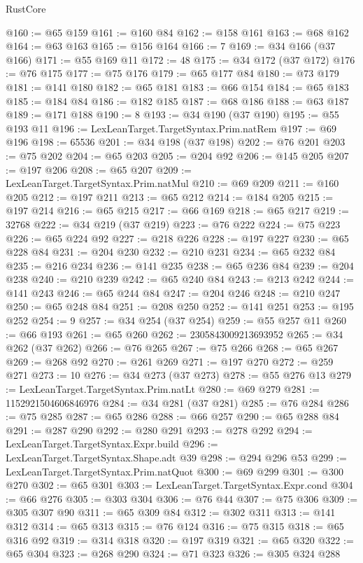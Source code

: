 \begin{lexlean}{RustCore}
\begin{coremodule}
@160 := @65 @159
@161 := @160 @84
@162 := @158 @161
@163 := @68 @162
@164 := @63 @163
@165 := @156 @164
@166 := 7
@169 := @34 @166 (@37 @166)
@171 := @55 @169 @11
@172 := 48
@175 := @34 @172 (@37 @172)
@176 := @76 @175
@177 := @75 @176
@179 := @65 @177 @84
@180 := @73 @179
@181 := @141 @180
@182 := @65 @181
@183 := @66 @154
@184 := @65 @183
@185 := @184 @84
@186 := @182 @185
@187 := @68 @186
@188 := @63 @187
@189 := @171 @188
@190 := 8
@193 := @34 @190 (@37 @190)
@195 := @55 @193 @11
@196 := LexLeanTarget.TargetSyntax.Prim.natRem
@197 := @69 @196
@198 := 65536
@201 := @34 @198 (@37 @198)
@202 := @76 @201
@203 := @75 @202
@204 := @65 @203
@205 := @204 @92
@206 := @145 @205
@207 := @197 @206
@208 := @65 @207
@209 := LexLeanTarget.TargetSyntax.Prim.natMul
@210 := @69 @209
@211 := @160 @205
@212 := @197 @211
@213 := @65 @212
@214 := @184 @205
@215 := @197 @214
@216 := @65 @215
@217 := @66 @169
@218 := @65 @217
@219 := 32768
@222 := @34 @219 (@37 @219)
@223 := @76 @222
@224 := @75 @223
@226 := @65 @224 @92
@227 := @218 @226
@228 := @197 @227
@230 := @65 @228 @84
@231 := @204 @230
@232 := @210 @231
@234 := @65 @232 @84
@235 := @216 @234
@236 := @141 @235
@238 := @65 @236 @84
@239 := @204 @238
@240 := @210 @239
@242 := @65 @240 @84
@243 := @213 @242
@244 := @141 @243
@246 := @65 @244 @84
@247 := @204 @246
@248 := @210 @247
@250 := @65 @248 @84
@251 := @208 @250
@252 := @141 @251
@253 := @195 @252
@254 := 9
@257 := @34 @254 (@37 @254)
@259 := @55 @257 @11
@260 := @66 @193
@261 := @65 @260
@262 := 2305843009213693952
@265 := @34 @262 (@37 @262)
@266 := @76 @265
@267 := @75 @266
@268 := @65 @267
@269 := @268 @92
@270 := @261 @269
@271 := @197 @270
@272 := @259 @271
@273 := 10
@276 := @34 @273 (@37 @273)
@278 := @55 @276 @13
@279 := LexLeanTarget.TargetSyntax.Prim.natLt
@280 := @69 @279
@281 := 1152921504606846976
@284 := @34 @281 (@37 @281)
@285 := @76 @284
@286 := @75 @285
@287 := @65 @286
@288 := @66 @257
@290 := @65 @288 @84
@291 := @287 @290
@292 := @280 @291
@293 := @278 @292
@294 := LexLeanTarget.TargetSyntax.Expr.build
@296 := LexLeanTarget.TargetSyntax.Shape.adt @39
@298 := @294 @296 @53
@299 := LexLeanTarget.TargetSyntax.Prim.natQuot
@300 := @69 @299
@301 := @300 @270
@302 := @65 @301
@303 := LexLeanTarget.TargetSyntax.Expr.cond
@304 := @66 @276
@305 := @303 @304
@306 := @76 @44
@307 := @75 @306
@309 := @305 @307 @90
@311 := @65 @309 @84
@312 := @302 @311
@313 := @141 @312
@314 := @65 @313
@315 := @76 @124
@316 := @75 @315
@318 := @65 @316 @92
@319 := @314 @318
@320 := @197 @319
@321 := @65 @320
@322 := @65 @304
@323 := @268 @290
@324 := @71 @323
@326 := @305 @324 @288

\end{coremodule}
\end{lexlean}
